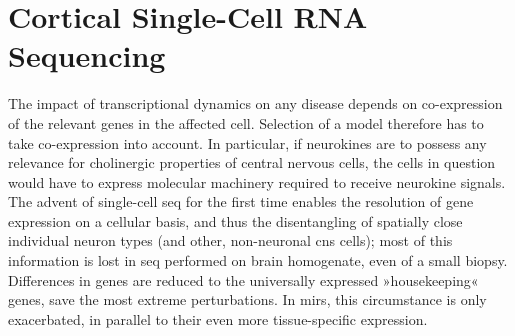 \section{Cortical Single-Cell RNA Sequencing} \label{sec:cellculture:singlecell}
The impact of transcriptional dynamics on any disease depends on co-expression of the relevant genes in the affected cell. Selection of a model therefore has to take co-expression into account. In particular, if neurokines are to possess any relevance for cholinergic properties of central nervous cells, the cells in question would have to express molecular machinery required to receive neurokine signals. The advent of single-cell \ac{seq} for the first time enables the resolution of gene expression on a cellular basis, and thus the disentangling of spatially close individual neuron types (and other, non-neuronal \ac{cns} cells); most of this information is lost in \ac{seq} performed on brain homogenate, even of a small biopsy. Differences in genes are reduced to the universally expressed »housekeeping« genes, save the most extreme perturbations. In \acp{mir}, this circumstance is only exacerbated, in parallel to their even more tissue-specific expression.

